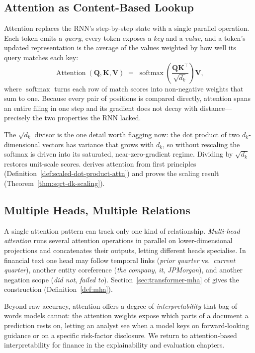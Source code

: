\begin{deepdive}

\subsection{Attention as Content-Based Lookup}
\label{sec:attention-mechanism}

Attention replaces the RNN's step-by-step state with a single parallel
operation.  Each token emits a \emph{query}, every token exposes a
\emph{key} and a \emph{value}, and a token's updated representation is the
average of the values weighted by how well its query matches each key:
\[
  \operatorname{Attention}(\mathbf{Q}, \mathbf{K}, \mathbf{V})
  \;=\;
  \operatorname{softmax}\!\!\left(\frac{\mathbf{Q}\mathbf{K}^{\top}}{\sqrt{d_k}}\right)\mathbf{V},
\]
where $\operatorname{softmax}$ turns each row of match scores into
non-negative weights that sum to one.  Because every pair of positions is
compared directly, attention spans an entire filing in one step and its
gradient does not decay with distance---precisely the two properties the
RNN lacked.

The $\sqrt{d_k}$ divisor is the one detail worth flagging now: the dot
product of two $d_k$-dimensional vectors has variance that grows with
$d_k$, so without rescaling the softmax is driven into its saturated,
near-zero-gradient regime.  Dividing by $\sqrt{d_k}$ restores unit-scale
scores.   derives attention from first
principles (Definition~\ref{def:scaled-dot-product-attn}) and proves the
scaling result (Theorem~\ref{thm:sqrt-dk-scaling}).

\subsection{Multiple Heads, Multiple Relations}
\label{sec:attention-multihead}

A single attention pattern can track only one kind of relationship.
\emph{Multi-head attention} runs several attention operations in parallel
on lower-dimensional projections and concatenates their outputs, letting
different heads specialise.  In financial text one head may follow temporal
links (\emph{prior quarter} vs.\ \emph{current quarter}), another entity
coreference (\emph{the company}, \emph{it}, \emph{JPMorgan}), and another
negation scope (\emph{did not}, \emph{failed to}).
Section~\ref{sec:transformer-mha} of  gives
the construction (Definition~\ref{def:mha}).

\begin{remark}
\label{rem:attention-finance}
Beyond raw accuracy, attention offers a degree of \emph{interpretability}
that bag-of-words models cannot: the attention weights expose which parts
of a document a prediction rests on, letting an analyst see when a model
keys on forward-looking guidance or on a specific risk-factor disclosure.
We return to attention-based interpretability for finance in the
explainability and evaluation chapters.
\end{remark}

\end{deepdive}

